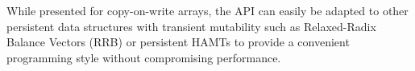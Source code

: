 While presented for copy-on-write arrays, the API
can easily be adapted to other persistent data structures with
transient mutability such as Relaxed-Radix Balance Vectors (RRB) \cite{DBLP:journals/pacmpl/Puente17}
or persistent HAMTs \cite{bagwell2001ideal,clojurehamt} to provide  a
convenient programming style without compromising performance.




